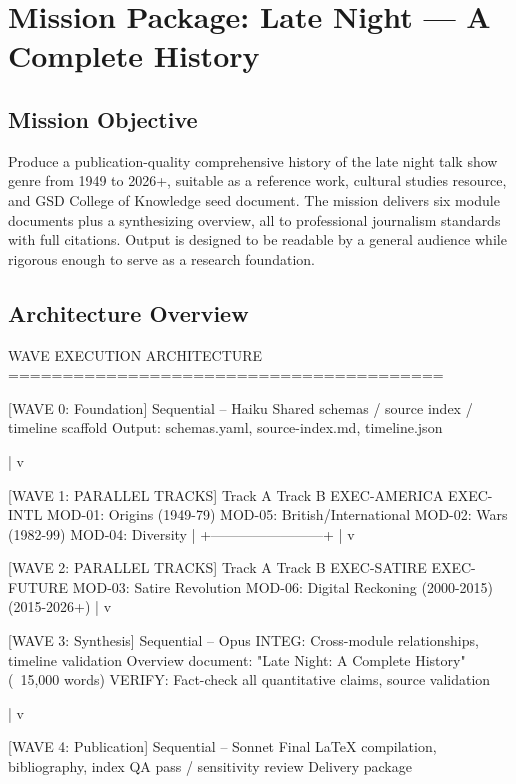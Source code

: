 \documentclass[11pt,letterpaper]{article}
\newcommand{\stageheader}[2]{%
  \noindent\colorbox{#2}{\makebox[\textwidth][l]{%
    \textcolor{white}{\bfseries\sffamily\hspace{6pt}#1\hspace{6pt}}}}%
  \vspace{0.5em}\par%
}
\begin{document}
\newpage
\stageheader{STAGE 3 --- MISSION PACKAGE}{tertiary}

\section{Mission Package: Late Night --- A Complete History}

\subsection{Mission Objective}

Produce a publication-quality comprehensive history of the late night talk show genre from 1949 to 2026+, suitable as a reference work, cultural studies resource, and GSD College of Knowledge seed document. The mission delivers six module documents plus a synthesizing overview, all to professional journalism standards with full citations. Output is designed to be readable by a general audience while rigorous enough to serve as a research foundation.

\subsection{Architecture Overview}

\begin{asciibox}
WAVE EXECUTION ARCHITECTURE
========================================

[WAVE 0: Foundation]
  Sequential -- Haiku
  Shared schemas / source index / timeline scaffold
  Output: schemas.yaml, source-index.md, timeline.json

     |
     v

[WAVE 1: PARALLEL TRACKS]
 Track A                        Track B
 EXEC-AMERICA                   EXEC-INTL
 MOD-01: Origins (1949-79)      MOD-05: British/International
 MOD-02: Wars (1982-99)         MOD-04: Diversity
                                         |
              +------------------------+
              |
     v

[WAVE 2: PARALLEL TRACKS]
 Track A                        Track B
 EXEC-SATIRE                    EXEC-FUTURE
 MOD-03: Satire Revolution       MOD-06: Digital Reckoning
 (2000-2015)                     (2015-2026+)
              |
              v

[WAVE 3: Synthesis]
  Sequential -- Opus
  INTEG: Cross-module relationships, timeline validation
  Overview document: "Late Night: A Complete History" (~15,000 words)
  VERIFY: Fact-check all quantitative claims, source validation

     |
     v

[WAVE 4: Publication]
  Sequential -- Sonnet
  Final LaTeX compilation, bibliography, index
  QA pass / sensitivity review
  Delivery package
\end{asciibox}
\end{document}
